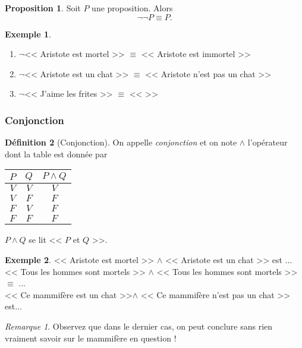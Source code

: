 \documentclass[11pt]{article}
\theoremstyle{definition}
\newtheorem{defn}{Définition}[section]
\newtheorem{prop}[defn]{Proposition}
\newtheorem{exe}{Exemple}
\theoremstyle{remark}
\newtheorem{rem}{Remarque}
\begin{document}
\begin{prop}
Soit $P$ une proposition. Alors
\[\neg\neg P \equiv P.
\]
\end{prop}

\begin{exe}\leavevmode\begin{enumerate}
\item $\neg$<< Aristote est mortel >> $\equiv$ << Aristote est immortel >>
\item $\neg$<< Aristote est un chat >> $\equiv$ << Aristote n'est pas un chat >>
\item $\neg$<< J'aime les frites >> $\equiv$ << \hspace{7cm} >>
\end{enumerate}

\end{exe}

\newpage
\subsubsection{Conjonction}

\begin{defn}[Conjonction]
On appelle \textit{conjonction} et on note $\land$ l'opérateur dont la table est donnée par

\begin{table}[!ht]
\centering
\begin{tabular}{|c|c|c|}\hline
$P$ & $Q$ & $P\land Q$ \\ \hline
$V$ & $V$ & $V$ \\\hline
$V$ & $F$ & $F$ \\\hline
$F$ & $V$ & $F$ \\\hline
$F$ & $F$ & $F$ \\\hline
\end{tabular}
\end{table}

$P\land Q$ se lit << $P$ et $Q$ >>.
\end{defn}

\begin{exe}
<< Aristote est mortel >> $\land$ << Aristote est un chat >> est ...\\
<< Tous les hommes sont mortels >> $\land$ << Tous les hommes sont mortels >> $\equiv$ ...\\
<< Ce mammifère est un chat >>$\land $ << Ce mammifère n'est pas un chat >> est...
\end{exe}

\begin{rem} Observez que dans le dernier cas, on peut conclure sans rien vraiment savoir sur le mammifère en question !
\end{rem}
\end{document}
